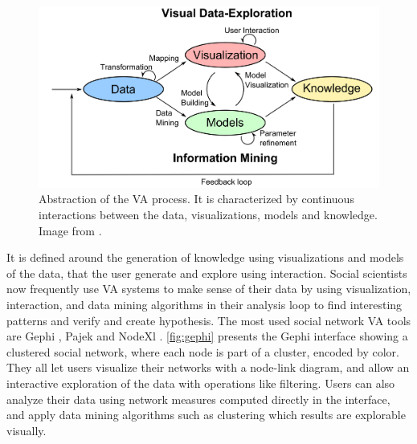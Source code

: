 \begin{figure}
    \centering %
    \includegraphics[width=1\textwidth]{static/figures/RelatedWork/Keim-VisualAnalytics.png}
    \caption{Abstraction of the VA process. It is characterized by continuous interactions between the data, visualizations, models and knowledge. Image from \cite{keimVisualAnalyticsDefinition2008}.}
    \label{fig:keim-va}
\end{figure}

It is defined around the generation of knowledge using visualizations and models of the data, that the user generate and explore using interaction.
Social scientists now frequently use VA systems to make sense of their data by using visualization, interaction, and data mining algorithms in their analysis loop to find interesting patterns and verify and create hypothesis.
The most used social network VA tools are Gephi \cite{Gephi}, Pajek \cite{batagelj_pajek_nodate} and NodeXl \cite{smithAnalyzingSocialMedia2009}. \autoref{fig:gephi} presents the Gephi interface showing a clustered social network, where each node is part of a cluster, encoded by color.
They all let users visualize their networks with a node-link diagram, and allow an interactive exploration of the data with operations like filtering.
Users can also analyze their data using network measures computed directly in the interface, and apply data mining algorithms such as clustering which results are explorable visually.



